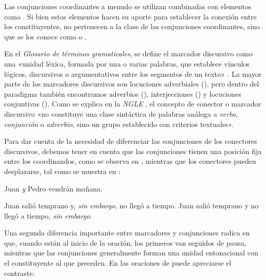 Las conjunciones coordinantes a menudo se utilizan combinadas con elementos como
. Si bien estos elementos hacen su aporte para
establecer la conexión entre los constituyentes, no pertenecen a la clase de las
conjunciones coordinantes, sino que se los conoce como  o
.

En el \textit{Glosario de términos gramaticales}, se define el marcador
discursivo como una «unidad léxica, formada por una o varias palabras, que
establece vínculos lógicos, discursivos o argumentativos entre los segmentos de
un texto» \parencite[74]{bosque2019}. La mayor parte de los marcadores
discursivos son locuciones adverbiales (), pero dentro del paradigma también encontramos adverbios
(), interjecciones () y locuciones
conjuntivas (). Como se explica en la \textit{NGLE}
\parencite[§\,30.12a]{rae2025}, el concepto de conector o marcador discursivo
«no constituye una clase sintáctica de palabras análoga a \textit{verbo,
conjunción} o \textit{adverbio}, sino un grupo establecido con criterios
textuales».

Para dar cuenta de la necesidad de diferenciar las conjunciones de los conectores
discursivos, debemos tener en cuenta que las conjunciones tienen una posición fija
entre los coordinandos, como se observa en , mientras que los
conectores pueden desplazarse, tal como se muestra en :

\begin{exe}
  \ex\label{ex:12-fija}
    \begin{xlist}
      \ex Juan \textit{y} Pedro vendrán mañana.
    \end{xlist}
  \ex\label{ex:12-movil}
    \begin{xlist}
      \ex Juan salió temprano y, \textit{sin embargo}, no llegó a tiempo.
      \ex Juan salió temprano y no llegó a tiempo, \textit{sin embargo}.
    \end{xlist}
\end{exe}

Una segunda diferencia importante entre marcadores y conjunciones radica en que,
cuando están al inicio de la oración, los primeros van seguidos de pausa,
mientras que las conjunciones generalmente forman una unidad entonacional con el
constituyente al que preceden. En las oraciones de  puede
apreciarse el contraste:

